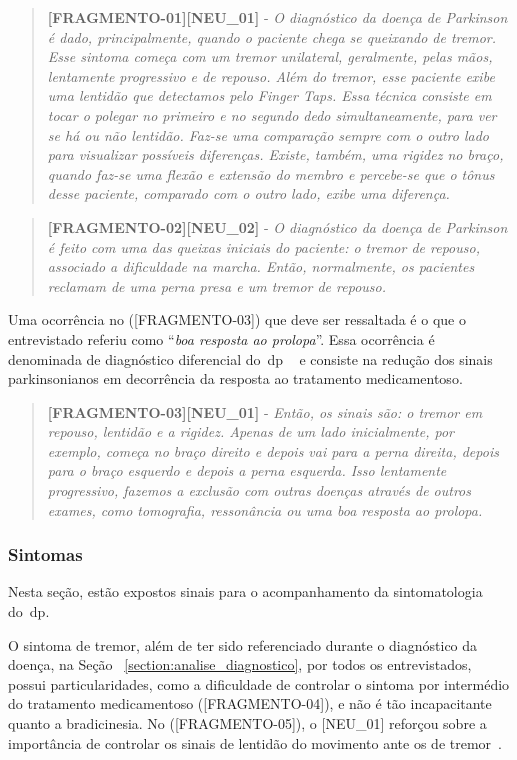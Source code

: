 \begin{quote}
\textbf{[FRAGMENTO-01][NEU\_01]} - 
\emph{
O diagnóstico da doença de Parkinson é dado, principalmente, quando o paciente chega se queixando de tremor. Esse sintoma começa com um tremor unilateral, geralmente, pelas mãos, lentamente progressivo e de repouso. Além do tremor, esse paciente exibe uma lentidão que detectamos pelo \textit{Finger Taps}. Essa técnica consiste em tocar o polegar no primeiro e no segundo dedo simultaneamente, para ver se há ou não lentidão. Faz-se uma comparação sempre com o outro lado para visualizar possíveis diferenças. Existe, também, uma rigidez no braço, quando faz-se uma flexão e extensão do membro e percebe-se que o tônus desse paciente, comparado com o outro lado, exibe uma diferença.
}
\end{quote}

\begin{quote}
\textbf{[FRAGMENTO-02][NEU\_02]} -
\emph{
O diagnóstico da doença de Parkinson é feito com uma das queixas iniciais do paciente: o tremor de repouso, associado  a dificuldade na marcha. Então, normalmente, os pacientes reclamam de uma perna presa e um tremor de repouso. 
}
\end{quote}

Uma ocorrência no ([FRAGMENTO-03]) que deve ser ressaltada é o que o entrevistado referiu como ``\textit{boa resposta ao prolopa}''. Essa ocorrência é denominada de diagnóstico diferencial do~\ac{dp} ~\cite{protpar010} e consiste na redução dos sinais parkinsonianos em decorrência da resposta ao tratamento medicamentoso. 

\begin{quote}
\textbf{[FRAGMENTO-03][NEU\_01]} - 
\emph{
Então, os sinais são: o tremor em repouso, lentidão e a rigidez. Apenas de um lado inicialmente, por exemplo, começa no braço direito e depois vai para a perna direita, depois para o braço esquerdo e depois a perna esquerda. Isso lentamente progressivo, fazemos a exclusão com outras doenças através de outros exames, como tomografia, ressonância ou uma boa resposta ao prolopa.
}
\end{quote}

\subsubsection{Sintomas}
Nesta seção, estão expostos sinais para o acompanhamento da sintomatologia do~\ac{dp}.

O sintoma de tremor, além de ter sido referenciado durante o diagnóstico da doença, na Seção ~\ref{section:analise_diagnostico}, por todos os entrevistados, possui particularidades, como a dificuldade de controlar o sintoma por intermédio do tratamento medicamentoso ([FRAGMENTO-04]), e não é tão incapacitante quanto a bradicinesia. No ([FRAGMENTO-05]), o [NEU\_01] reforçou sobre a importância de controlar os sinais de lentidão do movimento ante os de tremor~\cite{do2007parkinson}.

